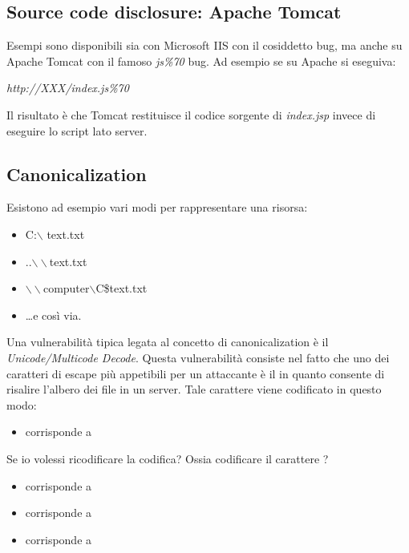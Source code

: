 \documentclass[14pt]{extreport}
\begin{document}
\subsection{Source code disclosure: Apache Tomcat}
Esempi sono disponibili sia con Microsoft IIS con il cosiddetto  bug, ma anche su Apache Tomcat con il famoso \textit{js\%70} bug. Ad esempio se su Apache si eseguiva:

\begin{center}
    \textit{http://XXX/index.js\%70}
\end{center}

Il risultato è che Tomcat restituisce il codice sorgente di \textit{index.jsp} invece di eseguire lo script lato server. 




\subsection{Canonicalization}

Esistono ad esempio vari modi per rappresentare una risorsa:


\begin{itemize}
    \item C:$\backslash$ text.txt
    
    \item ..$\backslash \backslash$text.txt
    
    \item $\backslash \backslash$computer$\backslash$C\$text.txt
    
    \item \ldots e così via.
\end{itemize}

Una vulnerabilità tipica legata al concetto di canonicalization è il \textit{Unicode/Multicode Decode}. Questa vulnerabilità consiste nel fatto che uno dei caratteri di escape più appetibili per un attaccante è il  in quanto consente di risalire l'albero dei file in un server. Tale carattere viene codificato in questo modo:


\begin{itemize}
    \item \say{$\backslash$} corrisponde a 
\end{itemize}

Se io volessi ricodificare la codifica? Ossia codificare il carattere ?

\begin{itemize}
    \item \say{\%} corrisponde a 
    
    \item {} corrisponde a 
    
    \item {} corrisponde a 
\end{itemize}
\end{document}
